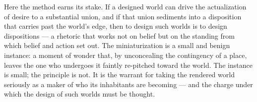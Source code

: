 Here the method earns its stake. If a designed world can drive the actualization of desire to a substantial union, and if that union sediments into a disposition that carries past the world's edge, then to design such worlds is to design dispositions — a rhetoric that works not on belief but on the standing from which belief and action set out. The miniaturization is a small and benign instance: a moment of wonder that, by unconcealing the contingency of a place, leaves the one who undergoes it faintly re-pitched toward the world. The instance is small; the principle is not. It is the warrant for taking the rendered world seriously as a maker of who its inhabitants are becoming — and the charge under which the design of such worlds must be thought.

\bigskip

